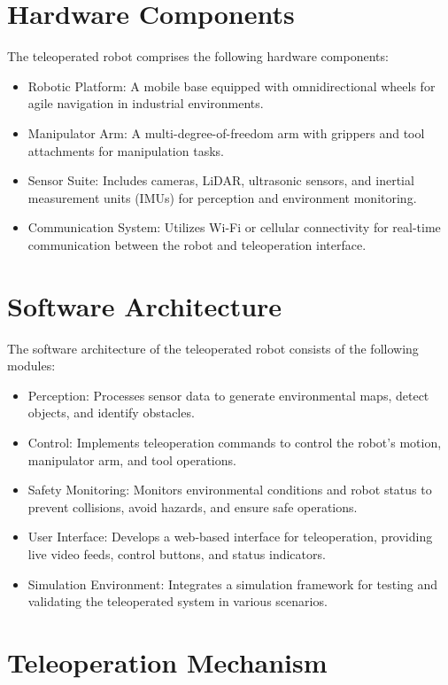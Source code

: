 \documentclass{article}
\begin{document}
\section{Hardware Components}

The teleoperated robot comprises the following hardware components:

\begin{itemize}
    \item Robotic Platform: A mobile base equipped with omnidirectional wheels for agile navigation in industrial environments.
    \item Manipulator Arm: A multi-degree-of-freedom arm with grippers and tool attachments for manipulation tasks.
    \item Sensor Suite: Includes cameras, LiDAR, ultrasonic sensors, and inertial measurement units (IMUs) for perception and environment monitoring.
    \item Communication System: Utilizes Wi-Fi or cellular connectivity for real-time communication between the robot and teleoperation interface.
\end{itemize}

\section{Software Architecture}

The software architecture of the teleoperated robot consists of the following modules:

\begin{itemize}
    \item Perception: Processes sensor data to generate environmental maps, detect objects, and identify obstacles.
    \item Control: Implements teleoperation commands to control the robot's motion, manipulator arm, and tool operations.
    \item Safety Monitoring: Monitors environmental conditions and robot status to prevent collisions, avoid hazards, and ensure safe operations.
    \item User Interface: Develops a web-based interface for teleoperation, providing live video feeds, control buttons, and status indicators.
    \item Simulation Environment: Integrates a simulation framework for testing and validating the teleoperated system in various scenarios.
\end{itemize}

\section{Teleoperation Mechanism}
\end{document}
